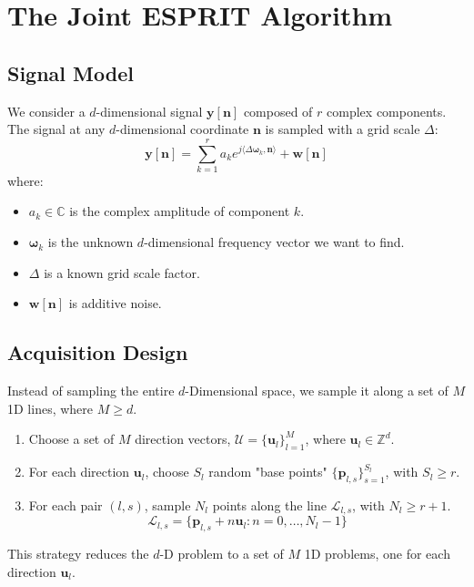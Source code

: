 \section{The Joint ESPRIT Algorithm}

\subsection*{Signal Model}
We consider a $d$-dimensional signal $\boldsymbol{y}[\boldsymbol{n}]$ composed of $r$ complex components.
The signal at any $d$-dimensional coordinate $\boldsymbol{n}$ is sampled with a grid scale $\Delta$:
$$ \boldsymbol{y}[\boldsymbol{n}] = \sum_{k=1}^{r} a_k e^{j\langle \Delta \boldsymbol{\omega}_k, \boldsymbol{n} \rangle} + \boldsymbol{w}[\boldsymbol{n}] $$
where:
\begin{itemize}
    \item $a_k \in \mathbb{C}$ is the complex amplitude of component $k$.
    \item $\boldsymbol{\omega}_k$ is the unknown $d$-dimensional frequency vector we want to find.
    \item $\Delta$ is a known grid scale factor.
    \item $\boldsymbol{w}[\boldsymbol{n}]$ is additive noise.
\end{itemize}

\subsection*{Acquisition Design}
Instead of sampling the entire $d$-Dimensional space, we sample it along a set of $M$ 1D lines, where $M \ge d$.
\begin{enumerate}
    \item Choose a set of $M$ direction vectors, $\mathcal{U} = \{\boldsymbol{u}_l\}_{l=1}^M$, where $\boldsymbol{u}_l \in \mathbb{Z}^d$.
    \item For each direction $\boldsymbol{u}_l$, choose $S_l$ random "base points" $\{\boldsymbol{p}_{l,s}\}_{s=1}^{S_l}$, with $S_l \ge r$.
    \item For each pair $(l, s)$, sample $N_l$ points along the line $\mathcal{L}_{l,s}$, with $N_l \ge r+1$.
    $$ \mathcal{L}_{l,s} = \{ \boldsymbol{p}_{l,s} + n \boldsymbol{u}_l : n = 0, \dots, N_l-1 \} $$
\end{enumerate}
This strategy reduces the $d$-D problem to a set of $M$ 1D problems, one for each direction $\boldsymbol{u}_l$.

